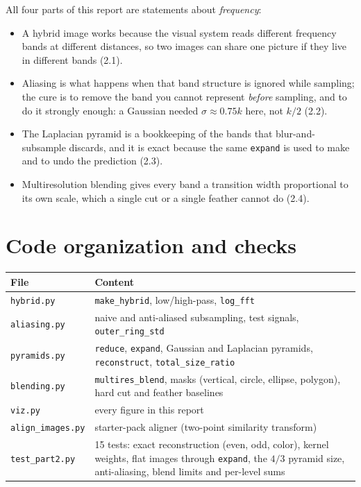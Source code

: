 \documentclass[11pt,a4paper]{article}
\begin{document}
All four parts of this report are statements about \emph{frequency}:
\begin{itemize}
  \item A hybrid image works because the visual system reads different frequency bands at different distances, so two images can share one picture if they live in different bands (2.1).
  \item Aliasing is what happens when that band structure is ignored while sampling; the cure is to remove the band you cannot represent \emph{before} sampling, and to do it
  strongly enough: a Gaussian needed $\sigma\approx0.75k$ here, not $k/2$ (2.2).
  \item The Laplacian pyramid is a bookkeeping of the bands that blur-and-subsample discards, and it is exact because the same \texttt{expand} is used to
  make and to undo the prediction (2.3).
  \item Multiresolution blending gives every band a transition width proportional to its own scale, which a single cut or a single feather cannot do (2.4).
\end{itemize}

\appendix
\section{Code organization and checks}

\begin{center}
\small
\begin{tabular}{@{}lp{12cm}@{}}
\toprule
File & Content\\
\midrule
\texttt{hybrid.py} & \texttt{make\_hybrid}, low/high-pass, \texttt{log\_fft}\\
\texttt{aliasing.py} & naive and anti-aliased subsampling, test signals, \texttt{outer\_ring\_std}\\
\texttt{pyramids.py} & \texttt{reduce}, \texttt{expand}, Gaussian and Laplacian pyramids, \texttt{reconstruct}, \texttt{total\_size\_ratio}\\
\texttt{blending.py} & \texttt{multires\_blend}, masks (vertical, circle, ellipse, polygon), hard cut and feather baselines\\
\texttt{viz.py} & every figure in this report\\
\texttt{align\_images.py} & starter-pack aligner (two-point similarity transform)\\
\texttt{test\_part2.py} & 15 tests: exact reconstruction (even, odd, color), kernel weights, flat images through \texttt{expand}, the $4/3$ pyramid size, anti-aliasing, blend limits and per-level sums\\
\bottomrule
\end{tabular}
\end{center}
\end{document}
